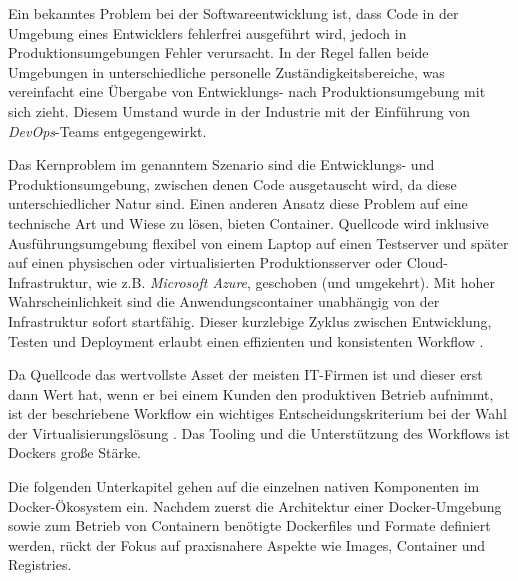 \documentclass[../main.tex]{subfiles}
\begin{document}
    Ein bekanntes Problem bei der Softwareentwicklung ist, dass Code in der Umgebung eines Entwicklers fehlerfrei ausgeführt wird, jedoch in Produktionsumgebungen Fehler verursacht. In der Regel fallen beide Umgebungen in unterschiedliche personelle Zuständigkeitsbereiche, was vereinfacht eine Übergabe von Entwicklungs- nach Produktionsumgebung mit sich zieht. Diesem Umstand wurde in der Industrie mit der Einführung von \emph{\gls{DevOps}}-Teams entgegengewirkt.

    Das Kernproblem im genanntem Szenario sind die Entwicklungs- und Produktionsumgebung, zwischen denen Code ausgetauscht wird, da diese unterschiedlicher Natur sind. Einen anderen Ansatz diese Problem auf eine technische Art und Wiese zu lösen, bieten Container. Quellcode wird inklusive Ausführungsumgebung flexibel von einem Laptop auf einen Testserver und später auf einen physischen oder virtualisierten Produktionsserver oder \gls{Cloud}-Infrastruktur, wie z.B. \emph{Microsoft Azure}, geschoben (und umgekehrt). Mit hoher Wahrscheinlichkeit sind die Anwendungscontainer unabhängig von der Infrastruktur sofort startfähig. Dieser kurzlebige Zyklus zwischen Entwicklung, Testen und Deployment erlaubt einen effizienten und konsistenten Workflow \cite[S.8+12]{dockerBook}.

    Da Quellcode das wertvollste Asset der meisten \acrshort{IT}-Firmen ist und dieser erst dann Wert hat, wenn er bei einem Kunden den produktiven Betrieb aufnimmt, ist der beschriebene Workflow ein wichtiges Entscheidungskriterium bei der Wahl der Virtualisierungslösung \cite[S.1]{dockerIntroIEEE}. Das Tooling und die Unterstützung des Workflows ist Dockers große Stärke.


		Die folgenden Unterkapitel gehen auf die einzelnen nativen Komponenten im Docker-Ökosystem ein. Nachdem zuerst die Architektur einer Docker-Umgebung sowie zum Betrieb von Containern benötigte Dockerfiles und Formate definiert werden, rückt der Fokus auf praxisnahere Aspekte wie Images, Container und Registries.


\end{document}
